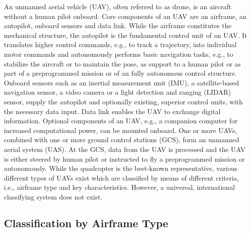 An unmanned aerial vehicle (UAV),
often referred to as drone, is an
aircraft without a human pilot onboard.
Core components of an UAV are an airframe,
an autopilot, onboard sensors and 
data link. 
While the airframe constitutes the mechanical structure,
the autopilot is the fundamental control unit of an UAV.
It translates higher control commands,
e.g., to track a trajectory,
into individual motor commands
and autonomously performs basic navigation tasks,
e.g., to stabilize the aircraft or to maintain the pose,
as support to a human pilot or as part of a preprogrammed mission
or of an fully autonomous control structure.
Onboard sensors such as
an inertial measurement unit (IMU), 
a satellite-based navigation sensor,
a video camera
or a light detection and ranging (LIDAR) sensor, 
supply the autopilot and optionally
existing, superior control units,
with the necessary data input.
Data link enables the UAV to
exchange digital information.
Optional components of an UAV,
e.g., a companion computer
for increased computational power,
can be mounted onboard.
One or more UAVs,
combined with one or more
ground control stations (GCS),
form an unmanned aerial system (UAS).
At the GCS, data from the UAV
is processed and the UAV 
is either steered by human pilot or
instructed to fly a preprogrammed mission or autonomously.
While the quadcopter is the best-known representative,
various different types of UAVs exist
which are classified by means of
different criteria, 
i.e., airframe type and key characteristics.
\cite{Fahlstrom2012}
However, a universal, international classifying system
does not exist.



\subsection{Classification by Airframe Type}

\label{Chapter2Section1Sub1}

